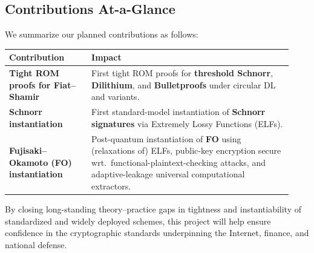 \subsection{Contributions At-a-Glance}

We summarize our planned contributions as follows: 
\begin{center}
\renewcommand{\arraystretch}{1.05}
\begin{tabular}{|p{0.27\linewidth}|p{0.66\linewidth}|}
\hline
\textbf{Contribution} & \textbf{Impact} \\
\hline
\textbf{Tight ROM proofs for Fiat--Shamir} & 
First tight ROM proofs for \textbf{threshold Schnorr}, \textbf{Dilithium}, and \textbf{Bulletproofs} under circular DL and variants.  \\
\hline
\textbf{Schnorr instantiation} & 
First standard-model instantiation of \textbf{Schnorr signatures} via Extremely Lossy Functions (ELFs). \\
\hline
\textbf{Fujisaki--Okamoto (FO) instantiation} & 
Post-quantum instantiation of \textbf{FO} using (relaxations of) ELFs, public-key encryption secure wrt.~functional-plaintext-checking attacks, and adaptive-leakage universal computational extractors. \\
\hline
\end{tabular}
\end{center}

By closing long-standing theory–practice gaps in tightness and instantiability of standardized and widely deployed schemes, this project will help ensure confidence in the cryptographic standards underpinning the Internet, finance, and national defense.



